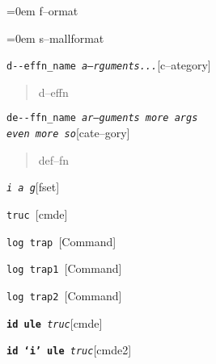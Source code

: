 \documentclass{book}
\begin{document}
\par\begingroup\obeylines\obeyspaces\frenchspacing\leftskip=0em \parskip=0pt \parindent=0pt %
f--ormat
\endgroup{}%

\par\begingroup\obeylines\obeyspaces\frenchspacing\leftskip=0em \parskip=0pt \parindent=0pt \footnotesize%
s--mallformat
\endgroup{}%

\noindent\texttt{d{-}{-}effn\_name \EmbracOn{}\textnormal{\textsl{a--rguments...}}\EmbracOff{}}\hfill[c--ategory]



%
\begin{quote}
d--effn
\end{quote}

\noindent\texttt{de{-}{-}ffn\_name \EmbracOn{}\textnormal{\textsl{ar--guments    more args \leavevmode{}\\ even more so}}\EmbracOff{}}\hfill[cate--gory]



%
\begin{quote}
def--fn
\end{quote}

\noindent\texttt{\textsl{i} \EmbracOn{}\textnormal{\textsl{a g}}\EmbracOff{}}\hfill[fset]



%
%
\noindent\texttt{truc \EmbracOn{}\textnormal{\textsl{}}\EmbracOff{}}\hfill[cmde]



%
\noindent\texttt{log trap \EmbracOn{}\textnormal{\textsl{}}\EmbracOff{}}\hfill[Command]



%
\noindent\texttt{log trap1 \EmbracOn{}\textnormal{\textsl{}}\EmbracOff{}}\hfill[Command]



%
\noindent\texttt{log trap2 \EmbracOn{}\textnormal{\textsl{}}\EmbracOff{}}\hfill[Command]



%
\noindent\texttt{\textbf{id ule} \EmbracOn{}\textnormal{\textsl{truc}}\EmbracOff{}}\hfill[cmde]



%
\noindent\texttt{\textbf{id `\texttt{i}' ule} \EmbracOn{}\textnormal{\textsl{truc}}\EmbracOff{}}\hfill[cmde2]
\end{document}
